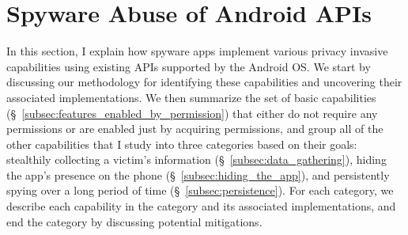 \section{Spyware Abuse of Android APIs}
\label{sec:api-abuse}

In this section, I explain how spyware apps implement various privacy invasive
capabilities using existing APIs supported by the Android OS.
We start by discussing our methodology for identifying these capabilities and uncovering their associated implementations.
We then summarize the set of basic capabilities (\S~\ref{subsec:features_enabled_by_permission}) that either do not require any permissions or are enabled just by acquiring permissions,
and group
all of the other capabilities that I study into three categories based on their goals: stealthily
collecting a victim's information (\S~\ref{subsec:data_gathering}), hiding the app's presence on the phone (\S~\ref{subsec:hiding_the_app}), and persistently
spying over a long period of time (\S~\ref{subsec:persistence}).
For each category, we
describe
each capability in the category and its associated implementations, and end
the category by discussing potential mitigations.


